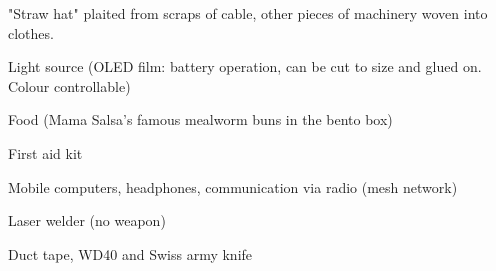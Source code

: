 \begin{npcBox}[title=Spark]
    \begin{stressSection}
    \end{stressSection}
    \begin{tabularx}{\textwidth}{ XX }
    \end{tabularx}
    
    \begin{consequences}
    \item {}
    \item {}
    \item {}
    \end{consequences}
\end{npcBox}
\newpage
\begin{npcBox}[title=Spark continued]
    \begin{npcDescription}
    "Straw hat" plaited from scraps of cable, other pieces of machinery woven into clothes.
    \end{npcDescription}


    \begin{equipment}
    \item Light source (OLED film: battery operation, can be cut to size and glued on. Colour controllable)
    \item Food (Mama Salsa's famous mealworm buns in the bento box)
    \item First aid kit
    \item Mobile computers, headphones, communication via radio (mesh network)
    \item Laser welder (no weapon)
    \item Duct tape, WD40 and Swiss army knife
    \end{equipment}
\end{npcBox}